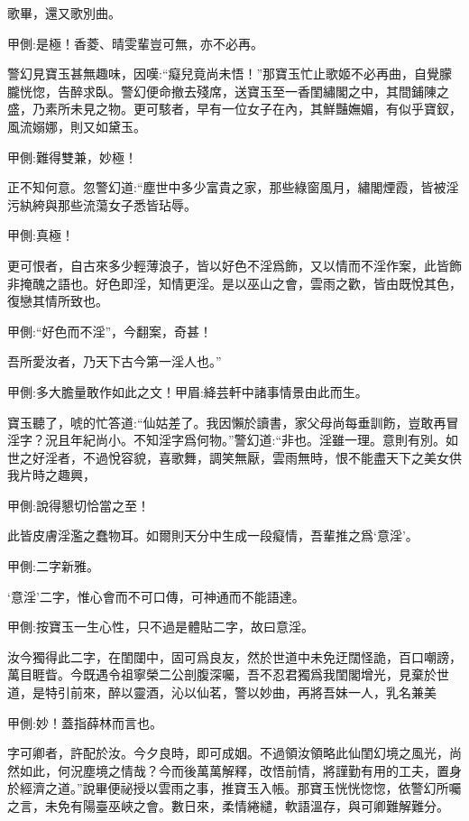 \begin{parag}
    歌畢，還又歌別曲。\begin{note}甲側:是極！香菱、晴雯輩豈可無，亦不必再。\end{note}警幻見寶玉甚無趣味，因嘆:“癡兒竟尚未悟！”那寶玉忙止歌姬不必再曲，自覺朦朧恍惚，告醉求臥。警幻便命撤去殘席，送寶玉至一香閨繡閣之中，其間鋪陳之盛，乃素所未見之物。更可駭者，早有一位女子在內，其鮮豔嫵媚，有似乎寶釵，風流嫋娜，則又如黛玉。\begin{note}甲側:難得雙兼，妙極！\end{note}正不知何意。忽警幻道:“塵世中多少富貴之家，那些綠窗風月，繡閣煙霞，皆被淫污紈絝與那些流蕩女子悉皆玷辱。\begin{note}甲側:真極！\end{note}更可恨者，自古來多少輕薄浪子，皆以好色不淫爲飾，又以情而不淫作案，此皆飾非掩醜之語也。好色即淫，知情更淫。是以巫山之會，雲雨之歡，皆由既悅其色，復戀其情所致也。\begin{note}甲側:“好色而不淫”，今翻案，奇甚！\end{note}吾所愛汝者，乃天下古今第一淫人也。”\begin{note}甲側:多大膽量敢作如此之文！甲眉:絳芸軒中諸事情景由此而生。\end{note}寶玉聽了，唬的忙答道:“仙姑差了。我因懶於讀書，家父母尚每垂訓飭，豈敢再冒淫字？況且年紀尚小。不知淫字爲何物。”警幻道:“非也。淫雖一理。意則有別。如世之好淫者，不過悅容貌，喜歌舞，調笑無厭，雲雨無時，恨不能盡天下之美女供我片時之趣興，\begin{note}甲側:說得懇切恰當之至！\end{note}此皆皮膚淫濫之蠢物耳。如爾則天分中生成一段癡情，吾輩推之爲‘意淫’。\begin{note}甲側:二字新雅。\end{note}‘意淫’二字，惟心會而不可口傳，可神通而不能語達。\begin{note}甲側:按寶玉一生心性，只不過是體貼二字，故曰意淫。\end{note}汝今獨得此二字，在閨闥中，固可爲良友，然於世道中未免迂闊怪詭，百口嘲謗，萬目睚眥。今既遇令祖寧榮二公剖腹深囑，吾不忍君獨爲我閨閣增光，見棄於世道，是特引前來，醉以靈酒，沁以仙茗，警以妙曲，再將吾妹一人，乳名兼美\begin{note}甲側:妙！蓋指薛林而言也。\end{note}字可卿者，許配於汝。今夕良時，即可成姻。不過領汝領略此仙閨幻境之風光，尚然如此，何況塵境之情哉？今而後萬萬解釋，改悟前情，將謹勤有用的工夫，置身於經濟之道。”說畢便祕授以雲雨之事，推寶玉入帳。那寶玉恍恍惚惚，依警幻所囑之言，未免有陽臺巫峽之會。數日來，柔情綣繾，軟語溫存，與可卿難解難分。
\end{parag}


